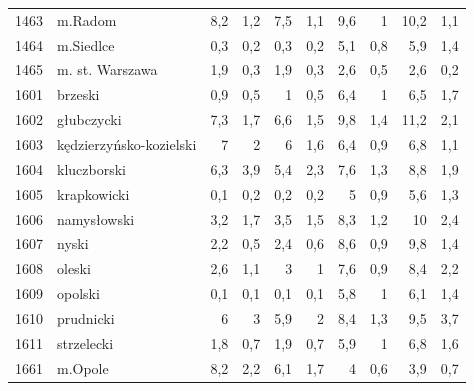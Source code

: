\begin{center}
\begin{longtable}{lp{3cm}rrrrrrrr}
1463 & m.Radom                 & 8,2     & 1,2         & 7,5      & 1,1          & 9,6      & 1            & 10,2     & 1,1          \\
1464 & m.Siedlce               & 0,3     & 0,2         & 0,3      & 0,2          & 5,1      & 0,8          & 5,9      & 1,4          \\
1465 & m. st. Warszawa         & 1,9     & 0,3         & 1,9      & 0,3          & 2,6      & 0,5          & 2,6      & 0,2          \\
1601 & brzeski                 & 0,9     & 0,5         & 1        & 0,5          & 6,4      & 1            & 6,5      & 1,7          \\
1602 & głubczycki              & 7,3     & 1,7         & 6,6      & 1,5          & 9,8      & 1,4          & 11,2     & 2,1          \\
1603 & kędzierzyńsko-kozielski & 7       & 2           & 6        & 1,6          & 6,4      & 0,9          & 6,8      & 1,1          \\
1604 & kluczborski             & 6,3     & 3,9         & 5,4      & 2,3          & 7,6      & 1,3          & 8,8      & 1,9          \\
1605 & krapkowicki             & 0,1     & 0,2         & 0,2      & 0,2          & 5        & 0,9          & 5,6      & 1,3          \\
1606 & namysłowski             & 3,2     & 1,7         & 3,5      & 1,5          & 8,3      & 1,2          & 10       & 2,4          \\
1607 & nyski                   & 2,2     & 0,5         & 2,4      & 0,6          & 8,6      & 0,9          & 9,8      & 1,4          \\
1608 & oleski                  & 2,6     & 1,1         & 3        & 1            & 7,6      & 0,9          & 8,4      & 2,2          \\
1609 & opolski                 & 0,1     & 0,1         & 0,1      & 0,1          & 5,8      & 1            & 6,1      & 1,4          \\
1610 & prudnicki               & 6       & 3           & 5,9      & 2            & 8,4      & 1,3          & 9,5      & 3,7          \\
1611 & strzelecki              & 1,8     & 0,7         & 1,9      & 0,7          & 5,9      & 1            & 6,8      & 1,6          \\
1661 & m.Opole                 & 8,2     & 2,2         & 6,1      & 1,7          & 4        & 0,6          & 3,9      & 0,7          \\

\end{longtable}
\end{center}
